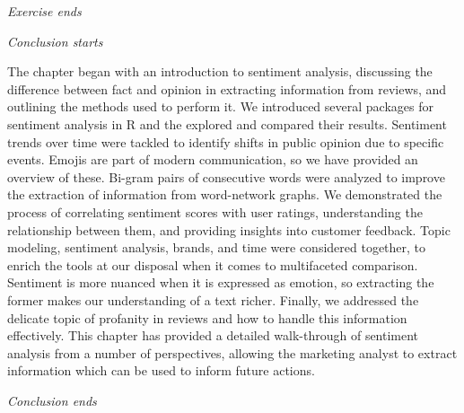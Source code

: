 \emph{Exercise ends}

\emph{Conclusion starts}

The chapter began with an introduction to sentiment analysis,
discussing the difference between fact and opinion in extracting
information from reviews, and outlining the methods used to perform it.
We introduced several packages for sentiment analysis in R and the explored and compared their results. Sentiment trends over
time were tackled to identify shifts in public opinion due to specific
events. Emojis are part of modern communication, so we have provided an overview of these. Bi-gram pairs of consecutive words were analyzed to improve the extraction of
information from word-network graphs. We demonstrated the
process of correlating sentiment scores with user ratings, understanding
the relationship between them, and providing insights into customer
feedback. Topic modeling, sentiment analysis, brands, and time were
considered together, to enrich the tools at our disposal when it
comes to multifaceted comparison. Sentiment is more nuanced when it is
expressed as emotion, so extracting the former makes our understanding of a
text richer. Finally, we addressed the delicate topic of profanity in
reviews and how to handle this information effectively. This chapter has
provided a detailed walk-through of sentiment analysis from a number of perspectives, allowing the marketing analyst to extract
information which can be used to inform future actions.

\emph{Conclusion ends}